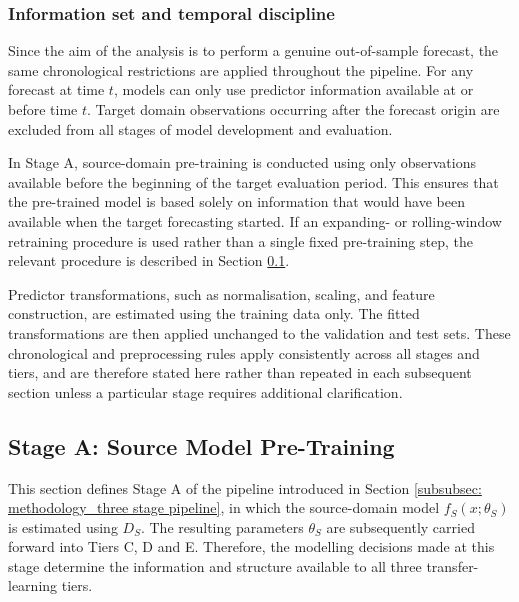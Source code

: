 \subsubsection{Information set and temporal discipline} \label{subsubsec: methodology_information set and temporal discipline}
Since the aim of the analysis is to perform a genuine out-of-sample forecast, the same chronological restrictions are applied throughout the pipeline. For any forecast at time $t$, models can only use predictor information available at or before time $t$. Target domain observations occurring after the forecast origin are excluded from all stages of model development and evaluation. 

In Stage A, source-domain pre-training is conducted using only observations available before the beginning of the target evaluation period. This ensures that the pre-trained model is based solely on information that would have been available when the target forecasting started. If an expanding- or rolling-window retraining procedure is used rather than a single fixed pre-training step, the relevant procedure is described in Section \ref{subsec: methodology_stage a}.

Predictor transformations, such as normalisation, scaling, and feature construction, are estimated using the training data only. The fitted transformations are then applied unchanged to the validation and test sets. These chronological and preprocessing rules apply consistently across all stages and tiers, and are therefore stated here rather than repeated in each subsequent section unless a particular stage requires additional clarification.

\subsection{Stage A: Source Model Pre-Training} \label{subsec: methodology_stage a}
This section defines Stage A of the pipeline introduced in Section \ref{subsubsec: methodology_three stage pipeline}, in which the source-domain model $f_S(x; \theta_S)$ is estimated using $D_S$. The resulting parameters $\theta_S$ are subsequently carried forward into Tiers C, D and E. Therefore, the modelling decisions made at this stage determine the information and structure available to all three transfer-learning tiers.

